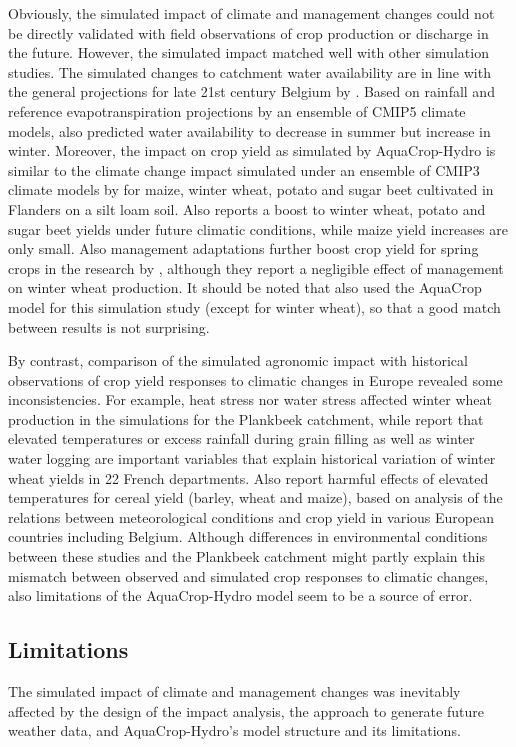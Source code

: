 Obviously, the simulated impact of climate and management changes could not be directly validated with field observations of crop production or discharge in the future. However, the simulated impact matched well with other simulation studies. The simulated changes to catchment water availability are in line with the general projections for late 21st century Belgium by \textcite{tabari2015}. Based on rainfall and reference evapotranspiration projections by an ensemble of CMIP5 climate models, also \textcite{tabari2015}  predicted water availability to decrease in summer but increase in winter. Moreover, the impact on crop yield as simulated by AquaCrop-Hydro is similar to the climate change impact simulated under an ensemble of CMIP3 climate models by \textcite{vanuytrecht2015} for maize, winter wheat, potato and sugar beet cultivated in Flanders on a silt loam soil. Also \textcite{vanuytrecht2015} reports a boost to winter wheat, potato and sugar beet yields under future climatic conditions, while maize yield increases are only small. Also management adaptations further boost crop yield for spring crops in the research by \textcite{vanuytrecht2015}, although they report a negligible effect of management on winter wheat production. It should be noted that \textcite{vanuytrecht2015} also used the AquaCrop model for this simulation study (except for winter wheat), so that a good match between results is not surprising. 

By contrast, comparison of the simulated agronomic impact with historical observations of crop yield responses to climatic changes in Europe revealed some inconsistencies. For example, heat stress nor water stress affected winter wheat production in the simulations for the Plankbeek catchment, while \textcite{gouache2015} report that elevated temperatures or excess rainfall during grain filling as well as winter water logging are important variables that explain historical variation of winter wheat yields in 22 French departments. Also \textcite{peltonensainio2010} report harmful effects of elevated temperatures for cereal yield (barley, wheat and maize), based on analysis of the relations between meteorological conditions and crop yield in various European countries including Belgium. Although differences in environmental conditions between these studies and the Plankbeek catchment might partly explain this mismatch between observed and simulated crop responses to climatic changes, also limitations of the AquaCrop-Hydro model seem to be a source of error. 

\subsection{Limitations} 
The simulated impact of climate and management changes was inevitably affected by the design of the impact analysis, the approach to generate future weather data, and AquaCrop-Hydro's model structure and its limitations.


